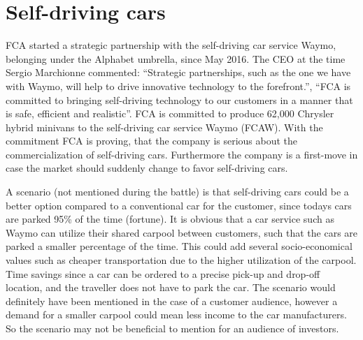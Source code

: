 

\section{Self-driving cars}

FCA started a strategic partnership with the self-driving car service Waymo, belonging under the Alphabet umbrella, since May 2016. The CEO at the time Sergio Marchionne commented: “Strategic partnerships, such as the one we have with Waymo, will help to drive innovative technology to the forefront.”, “FCA is committed to bringing self-driving technology to our customers in a manner that is safe, efficient and realistic”. FCA is committed to produce 62,000 Chrysler hybrid minivans to the self-driving car service Waymo (FCAW). With the commitment FCA is proving, that the company is serious about the commercialization of self-driving cars. Furthermore the company is a first-move in case the market should suddenly change to favor self-driving cars.

A scenario (not mentioned during the battle) is that self-driving cars could be a better option compared to a conventional car for the customer, since todays cars are parked 95\% of the time (fortune). It is obvious that a car service such as Waymo can utilize their shared carpool between customers, such that the cars are parked a smaller percentage of the time. This could add several socio-economical values such as cheaper transportation due to the higher utilization of the carpool. Time savings since a car can be ordered to a precise pick-up and drop-off location, and the traveller does not have to park the car. The scenario would definitely have been mentioned in the case of a customer audience, however a demand for a smaller carpool could mean less income to the car manufacturers. So the scenario may not be beneficial to mention for an audience of investors.

